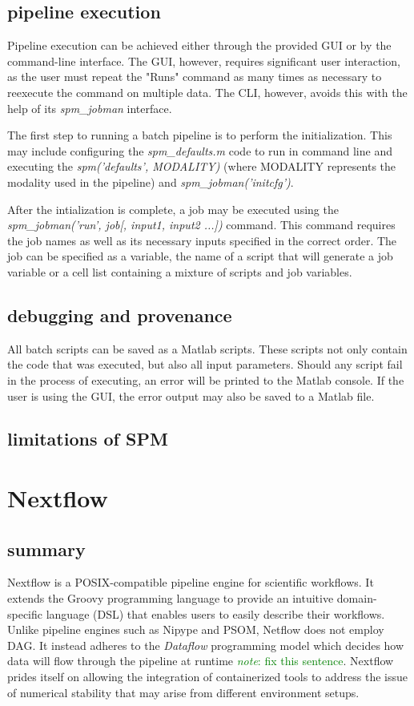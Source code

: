 \documentclass{report}
\newcommand{\note}[1]{\textcolor{green}{\textit{note}: #1}}
\begin{document}
        \subsection{pipeline execution}
        Pipeline execution can be achieved either through the provided GUI or by
the command-line interface. The GUI, however, requires significant user
interaction, as the user must repeat the "Runs" command as many times as
necessary to reexecute the command on multiple data. The CLI, however, avoids
this with the help of its \textit{spm\_jobman} interface.

        The first step to running a batch pipeline is to perform the
initialization. This may include configuring the \textit{spm\_defaults.m} code
to run in command line and executing the \textit{spm(’defaults’, MODALITY)}
(where MODALITY represents the modality used in the pipeline) and
\textit{spm\_jobman(’initcfg’)}.

        After the intialization is complete, a job may be executed using the
\textit{spm\_jobman(’run’, job[, input1, input2 ...])} command. This command
requires the job names as well as its necessary inputs specified in the correct
order. The job can be specified as a variable, the name of a script that will
generate a job variable or a cell list containing a mixture of scripts and job
variables. 
         
        \subsection{debugging and provenance}
        All batch scripts can be saved as a Matlab scripts. These scripts not
only contain the code that was executed, but also all input parameters. Should
any script fail in the process of executing, an error will be printed to the
Matlab console. If the user is using the GUI, the error output may also be saved
to a Matlab file.
    
        \subsection{limitations of SPM}
    \section{Nextflow}
        \subsection{summary}
        Nextflow is a POSIX-compatible pipeline engine for scientific workflows.
It extends the Groovy programming language to provide an  intuitive domain-specific language (DSL) 
that enables users to easily describe their workflows. Unlike pipeline engines such as Nipype and
PSOM, Netflow does not employ DAG. It instead adheres to the
\textit{Dataflow} programming model which decides how data will flow through the pipeline at
runtime \note{fix this sentence}. Nextflow prides itself on allowing the
integration of containerized tools to address the issue of numerical stability
that may arise from different environment setups.
  
\end{document}
